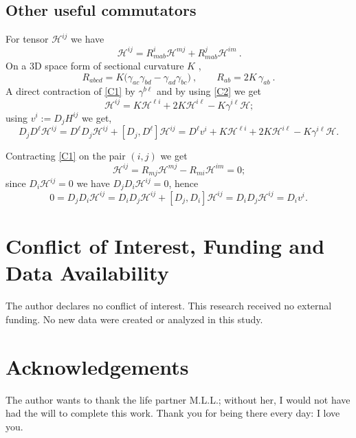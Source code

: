 \documentclass[a4paper,12pt]{article}
\begin{document}
\subsection{Other useful commutators}\label{comms}

For tensor $\mathcal{H}^{ij}$ we have
\begin{equation}
[D_{a},D_{b}]\,\mathcal{H}^{ij}
=
R^{i}_{mab}\mathcal{H}^{mj} + R^{j}_{mab}\mathcal{H}^{im} \ .
\label{C1}
\end{equation}
On a 3D space form of sectional curvature $K$ ,
\begin{equation}
R_{abcd}=K\big(\gamma_{ac}\gamma_{bd}-\gamma_{ad}\gamma_{bc}\big) \ , \qquad
R_{ab}=2K\,\gamma_{ab} \ .
\label{C2}
\end{equation}
A direct contraction of \eqref{C1} by $\gamma^{b\ell} $ and by using \eqref{C2} we get
\begin{equation}
[D_{j},D^{\ell}]\,\mathcal{H}^{ij}
=
K\mathcal{H}^{\ell i}+ 2K\mathcal{H}^{i \ell} - K\gamma^{i \ell}\mathcal{H};
\label{C3}
\end{equation}
using $v^{i}:=D_{j}H^{ij}$ we get,
\begin{equation}
D_{j}D^{\ell}\mathcal{H}^{ij}
=
D^{\ell}D_{j}\mathcal{H}^{ij} + [D_{j},D^{\ell}]\mathcal{H}^{ij}
=
D^{\ell}v^{i}+K\mathcal{H}^{\ell i}+ 2K\mathcal{H}^{i \ell} - K\gamma^{i \ell}\mathcal{H}.
\label{comm2}
\end{equation}

Contracting \eqref{C1} on the pair $(i,j)$ we get
\begin{equation}
[D_{i},D_{j}]\,\mathcal{H}^{ij}
=
R_{mj}\mathcal{H}^{mj}-R_{mi}\mathcal{H}^{im}
=0;
\end{equation}
since $D_{i}\mathcal{H}^{ij}=0$ we have $D_{j}D_{i}\mathcal{H}^{ij}=0$, hence
\begin{equation}
0
=
D_{j}D_{i}\mathcal{H}^{ij}
=
D_{i}D_{j}\mathcal{H}^{ij}+[D_{j},D_{i}]\mathcal{H}^{ij}
=
D_{i}D_{j}\mathcal{H}^{ij}=D_{i}v^{i}.
\label{comm3}
\end{equation}

\section*{Conflict of Interest, Funding and Data Availability}
The author declares no conflict of interest. This research received no external funding. No new data were created or analyzed in this study.

\section*{Acknowledgements}
The author wants to thank the life partner M.L.L.; without her, I would not have had the will to complete this work. Thank you for being there every day: I love you.









 

\end{document}
